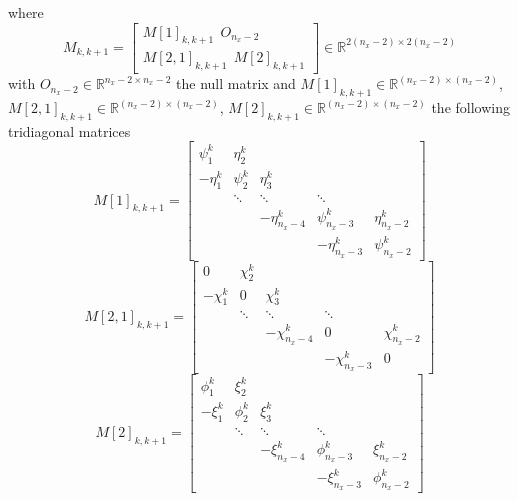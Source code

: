 where 
\begin{equation}
M_{k,k+1}=\left[\begin{array}{lllllllllllll}
M[1]_{k,k+1} \ \ O_{n_{x}-2}\\
M[2,1]_{k,k+1} \ \ M[2]_{k,k+1}
\end{array}\right] \in \mathbb{R}^{2(n_{x}-2)\times 2(n_{x}-2)} 
\end{equation}
with $O_{n_{x}-2}\in \mathbb{R}^{n_{x}-2\times n_{x}-2}$ the null matrix and $M[1]_{k,k+1}\in \mathbb{R}^{(n_{x}-2)\times (n_{x}-2)}$, $M[2,1]_{k,k+1}\in \mathbb{R}^{(n_{x}-2)\times (n_{x}-2)}$, $M[2]_{k,k+1}\in \mathbb{R}^{(n_{x}-2)\times (n_{x}-2)}$ the following tridiagonal matrices 
{\footnotesize
\begin{equation}
M[1]_{k,k+1}=\left[\begin{array}{lllllllllllll}
\psi_{1}^{k} & \eta_{2}^{k} & & & \\
-\eta_{1}^{k}& \psi_{2}^{k}  &  \eta_{3}^{k} & &  \\
& \ddots & \ddots & \ddots   \\
& &-\eta_{n_{x}-4}^{k} & \psi_{n_{x}-3}^{k}  &\eta_{n_{x}-2}^{k}  \\
& &  &-\eta_{n_{x}-3 }^{k} & \psi_{n_{x}-2}^{k}
\end{array}\right]
\end{equation}
\begin{equation}
M[2,1]_{k,k+1}=\left[\begin{array}{lllllllllllll}
0 & \chi_{2}^{k}& & & \\
-\chi_{1}^{k}& 0 &  \chi_{3}^{k} & & \\
& \ddots & \ddots & \ddots   \\
& &-\chi_{n_{x}-4}^{k} & 0  &\chi_{n_{x}-2}^{k}  \\
& &  &-\chi_{n_{x}-3 }^{k}  & 0
\end{array}\right]
\end{equation}
\begin{equation}
M[2]_{k,k+1}=\left[\begin{array}{lllllllllllll}
\phi_{1}^{k} & \xi_{2}^{k}& & & \\
-\xi_{1}^{k}& \phi_{2}^{k} & \xi_{3}^{k} & & \\
& \ddots & \ddots & \ddots   \\
& &-\xi_{n_{x}-4}^{k} & \phi_{n_{x}-3}^{k}  &\xi_{n_{x}-2}^{k}  \\
& &  &-\xi_{n_{x}-3}^{k}  & \phi_{n_{x}-2}^{k}
\end{array}\right]
\end{equation}
}
